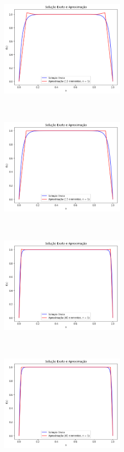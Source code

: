 \documentclass{article}
\begin{document}
\begin{itemize}
\begin{figure}[!htb]
\centering
\includegraphics [width=6cm,height=6cm]{LetraB/12el_n1_e10-3.png}
\includegraphics [width=6cm,height=6cm]{LetraB/13el_n1_e10-3.png}
\includegraphics [width=6cm,height=6cm]{LetraB/40el_n1_e10-4.png}
\includegraphics [width=6cm,height=6cm]{LetraB/41el_n1_e10-4.png}
\end{figure}


\end{itemize}
\end{document}
